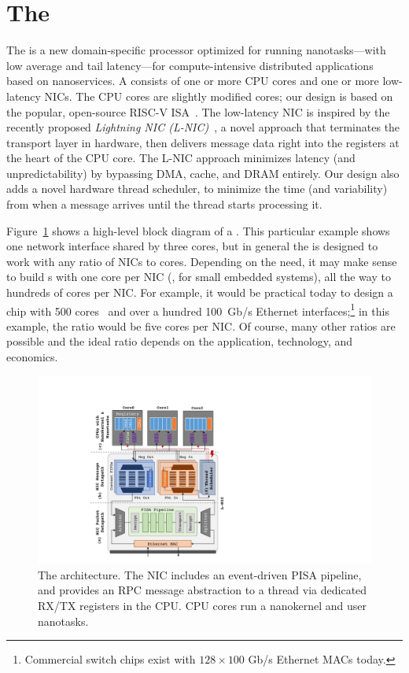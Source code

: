 \section{The \name{}}
\label{sec:nanoPU}
The \name{} is a new domain-specific processor optimized for running nanotasks---with low average and tail latency---for compute-intensive distributed applications based on nanoservices. 
A \name{} consists of one or more CPU cores and one or more low-latency NICs. 
The CPU cores are slightly modified cores; our design is based on the popular, open-source RISC-V ISA~\cite{riscv}. 
The low-latency NIC is inspired by the recently proposed {\em Lightning NIC (L-NIC)}~\cite{lnic}, a novel approach that terminates the transport layer in hardware, then delivers message data right into the registers at the heart of the CPU core.  
The L-NIC approach minimizes latency (and unpredictability) by bypassing DMA, cache, and DRAM entirely. 
Our \name{} design also adds a novel hardware thread scheduler, to minimize the time (and variability) from when a message arrives until the thread starts processing it.

Figure~\ref{fig:nanoPU} shows a high-level block diagram of a \name{}. 
This particular example shows one network interface shared by three cores, but in general the \name{} is designed to work with any ratio of NICs to cores. 
Depending on the need, it may make sense to build \name{}s with one core per NIC (\eg, for small embedded systems), all the way to hundreds of cores per NIC. 
For example, it would be practical today to design a chip with 500 cores~\cite{celerity, kilocore} and over a hundred \SI{100}{Gb/s} Ethernet interfaces;\footnote{Commercial switch chips exist with $128\times 100$ Gb/s Ethernet MACs today.} in this example, the ratio would be five cores per NIC. 
Of course, many other ratios are possible and the ideal ratio depends on the application, technology, and economics. 

\begin{figure}
  \includegraphics[width=0.95\linewidth]{./figures/nanopu-arch}
  \caption{The \name{} architecture. The NIC includes an event-driven PISA pipeline, and provides an RPC message abstraction to a thread via dedicated RX/TX registers in the CPU. CPU cores run a nanokernel and user nanotasks.}
  \label{fig:nanoPU}
\end{figure}

